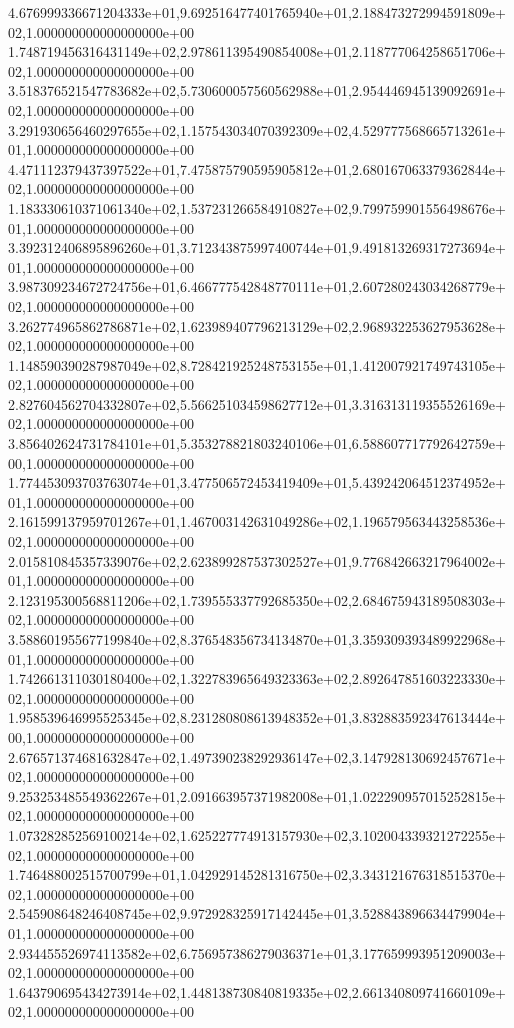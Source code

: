 4.676999336671204333e+01,9.692516477401765940e+01,2.188473272994591809e+02,1.000000000000000000e+00
1.748719456316431149e+02,2.978611395490854008e+01,2.118777064258651706e+02,1.000000000000000000e+00
3.518376521547783682e+02,5.730600057560562988e+01,2.954446945139092691e+02,1.000000000000000000e+00
3.291930656460297655e+02,1.157543034070392309e+02,4.529777568665713261e+01,1.000000000000000000e+00
4.471112379437397522e+01,7.475875790595905812e+01,2.680167063379362844e+02,1.000000000000000000e+00
1.183330610371061340e+02,1.537231266584910827e+02,9.799759901556498676e+01,1.000000000000000000e+00
3.392312406895896260e+01,3.712343875997400744e+01,9.491813269317273694e+01,1.000000000000000000e+00
3.987309234672724756e+01,6.466777542848770111e+01,2.607280243034268779e+02,1.000000000000000000e+00
3.262774965862786871e+02,1.623989407796213129e+02,2.968932253627953628e+02,1.000000000000000000e+00
1.148590390287987049e+02,8.728421925248753155e+01,1.412007921749743105e+02,1.000000000000000000e+00
2.827604562704332807e+02,5.566251034598627712e+01,3.316313119355526169e+02,1.000000000000000000e+00
3.856402624731784101e+01,5.353278821803240106e+01,6.588607717792642759e+00,1.000000000000000000e+00
1.774453093703763074e+01,3.477506572453419409e+01,5.439242064512374952e+01,1.000000000000000000e+00
2.161599137959701267e+01,1.467003142631049286e+02,1.196579563443258536e+02,1.000000000000000000e+00
2.015810845357339076e+02,2.623899287537302527e+01,9.776842663217964002e+01,1.000000000000000000e+00
2.123195300568811206e+02,1.739555337792685350e+02,2.684675943189508303e+02,1.000000000000000000e+00
3.588601955677199840e+02,8.376548356734134870e+01,3.359309393489922968e+01,1.000000000000000000e+00
1.742661311030180400e+02,1.322783965649323363e+02,2.892647851603223330e+02,1.000000000000000000e+00
1.958539646995525345e+02,8.231280808613948352e+01,3.832883592347613444e+00,1.000000000000000000e+00
2.676571374681632847e+02,1.497390238292936147e+02,3.147928130692457671e+02,1.000000000000000000e+00
9.253253485549362267e+01,2.091663957371982008e+01,1.022290957015252815e+02,1.000000000000000000e+00
1.073282852569100214e+02,1.625227774913157930e+02,3.102004339321272255e+02,1.000000000000000000e+00
1.746488002515700799e+01,1.042929145281316750e+02,3.343121676318515370e+02,1.000000000000000000e+00
2.545908648246408745e+02,9.972928325917142445e+01,3.528843896634479904e+01,1.000000000000000000e+00
2.934455526974113582e+02,6.756957386279036371e+01,3.177659993951209003e+02,1.000000000000000000e+00
1.643790695434273914e+02,1.448138730840819335e+02,2.661340809741660109e+02,1.000000000000000000e+00
